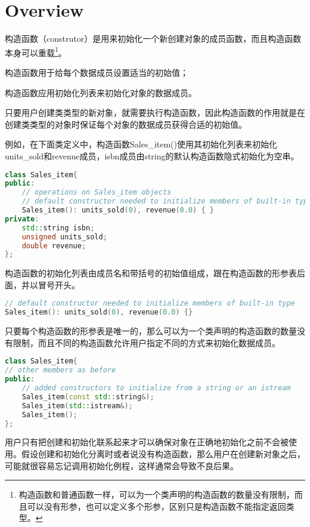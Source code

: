 \section{Overview}


构造函数（construtor）是用来初始化一个新创建对象的成员函数，而且构造函数本身可以重载\footnote{构造函数和普通函数一样，可以为一个类声明的构造函数的数量没有限制，而且可以没有形参，也可以定义多个形参，区别只是构造函数不能指定返回类型。}。

\begin{compactitem}
\item 构造函数用于给每个数据成员设置适当的初始值；
\item 构造函数应用初始化列表来初始化对象的数据成员。
\end{compactitem}

只要用户创建类类型的新对象，就需要执行构造函数，因此构造函数的作用就是在创建类类型的对象时保证每个对象的数据成员获得合适的初始值。

例如，在下面类定义中，构造函数Sales\_item()使用其初始化列表来初始化units\_sold和revenue成员，isbn成员由string的默认构造函数隐式初始化为空串。


\begin{lstlisting}[language=C++]
class Sales_item{
public:
	// operations on Sales_item objects
	// default constructor needed to initialize members of built-in type
	Sales_item(): units_sold(0), revenue(0.0) { }
private:
	std::string isbn;
	unsigned units_sold;
	double revenue;
};
\end{lstlisting}


构造函数的初始化列表由成员名和带括号的初始值组成，跟在构造函数的形参表后面，并以冒号开头。

\begin{lstlisting}[language=C++]
// default constructor needed to initialize members of built-in type
Sales_item(): units_sold(0), revenue(0.0) {}
\end{lstlisting}

只要每个构造函数的形参表是唯一的，那么可以为一个类声明的构造函数的数量没有限制，而且不同的构造函数允许用户指定不同的方式来初始化数据成员。

\begin{lstlisting}[language=C++]
class Sales_item{
// other members as before
public:
	// added constructors to initialize from a string or an istream
	Sales_item(const std::string&);
	Sales_item(std::istream&);
	Sales_item();
};
\end{lstlisting}


用户只有把创建和初始化联系起来才可以确保对象在正确地初始化之前不会被使用。假设创建和初始化分离时或者说没有构造函数，那么用户在创建新对象之后，可能就很容易忘记调用初始化例程，这样通常会导致不良后果。

